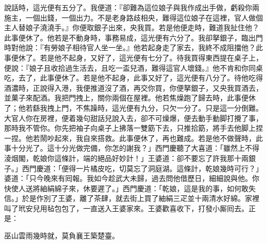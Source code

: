 說話時，這光便有五分了。我便道：『卻難為這位娘子與我作成出手做，虧殺你兩施主，一個出錢，一個出力。不是老身路歧相央，難得這位娘子在這裡，官人做個主人替娘子澆澆手。』你便取銀子出來，央我買。若是他便走時，難道我扯住他？此事便休了。他若是不動身時，事務易成，這光便有六分了。我卻拏銀子，臨出門時對他說：{}『有勞娘子相待官人坐一坐。』他若起身走了家去，我終不成阻擋他？此事便休了。若是他不起身，又好了，這光便有七分了。待我買得東西提在桌子上，便說：『娘子且收拾過生活去，且吃一盃兒酒，難得這官人壞錢。』他不肯和你同桌吃，去了，此事便休了。若是他不起身，此事又好了，這光便有八分了。待他吃得酒濃時，正說得入港，我便推道沒了酒，再交你買，你便拏銀子，又央我買酒去，並菓子來配酒。我把門拽上，關你兩個在屋裡。他若焦燥跑了歸去時，此事便休了；他若繇我拽上門，不焦躁時，這光便有九分，只欠一分了。只是這一分倒難。大官人你在房裡，便着幾句甜話兒說入去，卻不可燥爆，便去動手動脚打攪了事，那時我不管你。你先把袖子向桌子上拂落一雙筯下去，只推拾筯，將手去他脚上捏一捏。他若鬧吵起來，我自來搭救。此事便休了，再也難成。若是他不做聲時，此事十分光了。這十分光做完備，你怎的謝我？」西門慶聽了大喜道：「雖然上不得淩烟閣，乾娘你這條計，端的絕品好妙計！」王婆道：卻不要忘了許我那十兩銀子。」{}西門慶道：「便得一片橘皮吃，切莫忘了洞庭湖。這條計，乾娘幾時可行？」婆道：「只今晚來有囘報。我如今趁武大未歸，過去問他借歷日，細細說與他。你快使人送將紬絹綿子來，休要遲了。」西門慶道：「乾娘，這是我的事，如何敢失信。」於是作別了王婆，離了茶肆，就去街上買了紬絹三疋並十兩清水好綿。家裡叫了玳安兒用毡包包了，一直送入王婆家來。王婆歡喜收下，打發小厮囘去。正是：

\begin{myquote} 
巫山雲雨幾時就，莫負襄王築楚臺。
\end{myquote} 

